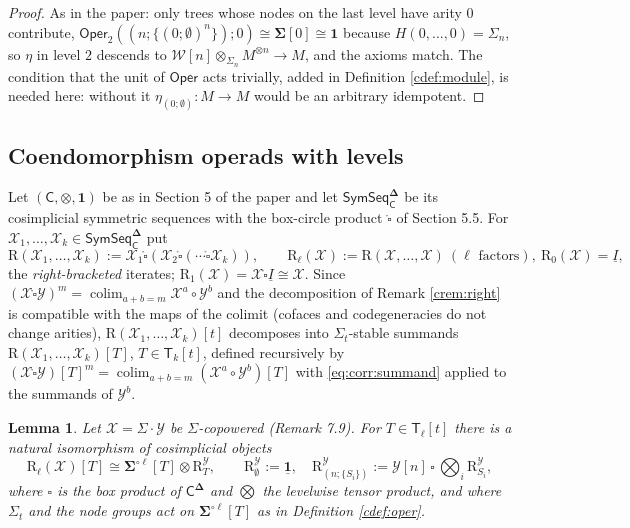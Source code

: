 \documentclass[12pt]{article}
\theoremstyle{plain}
\newtheorem{clemma}[ctheorem]{Lemma}
\theoremstyle{definition}
\theoremstyle{remark}
\newcommand{\Cal}[1]{\mathcal{#1}}
\newcommand{\Oper}{\mathsf{Oper}}
\newcommand{\SymSeq}{\mathsf{SymSeq}}
\newcommand{\bdel}{\mathbf{\Delta}}
\newcommand{\boxcirc}{\mathring{\square}}
\newcommand{\Tr}{\mathsf{T}}
\newcommand{\Rr}{\mathrm{R}}
\begin{document}
\begin{proof}
As in the paper: only trees whose nodes on the last level have arity $0$ contribute, $\Oper_2((n;\{(0;\emptyset)^n\});0)\cong\mathbf\Sigma[0]\cong\mathbf1$ because $H(0,\dots,0)=\Sigma_n$, so $\eta$ in level $2$ descends to $\Cal W[n]\otimes_{\Sigma_n}M^{\otimes n}\to M$, and the axioms match. The condition that the unit of $\Oper$ acts trivially, added in Definition \ref{cdef:module}, is needed here: without it $\eta_{(0;\emptyset)}\colon M\to M$ would be an arbitrary idempotent.
\end{proof}

\subsection{Coendomorphism operads with levels}
\label{sec:corr:coend}

Let $(\mathsf C,\otimes,\mathbf1)$ be as in Section 5 of the paper and let $\SymSeq^{\bdel}_{\mathsf C}$ be its cosimplicial symmetric sequences with the box-circle product $\boxcirc$ of Section 5.5. For $\Cal X_1,\dots,\Cal X_k\in\SymSeq^{\bdel}_{\mathsf C}$ put
\[\Rr(\Cal X_1,\dots,\Cal X_k):=\Cal X_1\boxcirc(\Cal X_2\boxcirc(\cdots\boxcirc\Cal X_k)),\qquad\Rr_\ell(\Cal X):=\Rr(\Cal X,\dots,\Cal X)\ (\ell\text{ factors}),\ \Rr_0(\Cal X)=\underline I,\]
the \emph{right-bracketed} iterates; $\Rr_1(\Cal X)=\Cal X\boxcirc\underline I\cong\Cal X$. Since $(\Cal X\boxcirc\Cal Y)^m=\operatorname{colim}_{a+b=m}\Cal X^a\circ\Cal Y^b$ and the decomposition of Remark \ref{crem:right} is compatible with the maps of the colimit (cofaces and codegeneracies do not change arities), $\Rr(\Cal X_1,\dots,\Cal X_k)[t]$ decomposes into $\Sigma_t$-stable summands $\Rr(\Cal X_1,\dots,\Cal X_k)[T]$, $T\in\Tr_k[t]$, defined recursively by $(\Cal X\boxcirc\Cal Y)[T]^m=\operatorname{colim}_{a+b=m}(\Cal X^a\circ\Cal Y^b)[T]$ with \eqref{eq:corr:summand} applied to the summands of $\Cal Y^b$.

\begin{clemma}\label{clem:copowered}
Let $\Cal X=\Sigma\cdot\Cal Y$ be $\Sigma$-copowered (Remark 7.9). For $T\in\Tr_\ell[t]$ there is a natural isomorphism of cosimplicial objects
\[\Rr_\ell(\Cal X)[T]\cong\mathbf\Sigma^{\circ\ell}[T]\otimes\Rr^{\Cal Y}_T,\qquad\Rr^{\Cal Y}_{\emptyset}:=\underline{\mathbf1},\quad\Rr^{\Cal Y}_{(n;\{S_i\})}:=\Cal Y[n]\,\square\,\bigotimes_i\Rr^{\Cal Y}_{S_i},\]
where $\square$ is the box product of $\mathsf C^{\bdel}$ and $\bigotimes$ the levelwise tensor product, and where $\Sigma_t$ and the node groups act on $\mathbf\Sigma^{\circ\ell}[T]$ as in Definition \ref{cdef:oper}.
\end{clemma}
\end{document}
